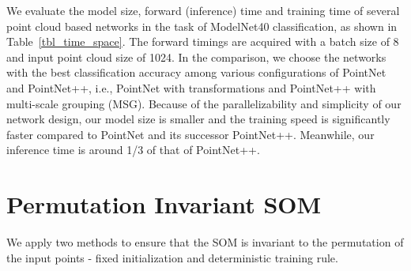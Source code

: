 \documentclass[10pt,twocolumn,letterpaper]{article}
\begin{document}
We evaluate the model size, forward (inference) time and training time of several point cloud based networks in the task of ModelNet40 classification, as shown in Table~\ref{tbl_time_space}. The forward timings are acquired with a batch size of 8 and input point cloud size of 1024. In the comparison, we choose the networks with the best classification accuracy among various configurations of PointNet and PointNet++, i.e., PointNet with transformations and PointNet++ with multi-scale grouping (MSG). Because of the parallelizability and simplicity of our network design, our model size is smaller and the training speed is significantly faster compared to PointNet and its successor PointNet++. Meanwhile, our inference time is around 1/3 of that of PointNet++.

\begin{table}[t!]
\caption{Time and space complexity of point cloud based networks in ModelNet40 classification. }
\label{tbl_time_space}
\vspace{-4pt}
\end{table}\section{Permutation Invariant SOM}\label{sec_supplementary_som}
We apply two methods to ensure that the SOM is invariant to the permutation of the input points - fixed initialization and deterministic training rule.
\end{document}
